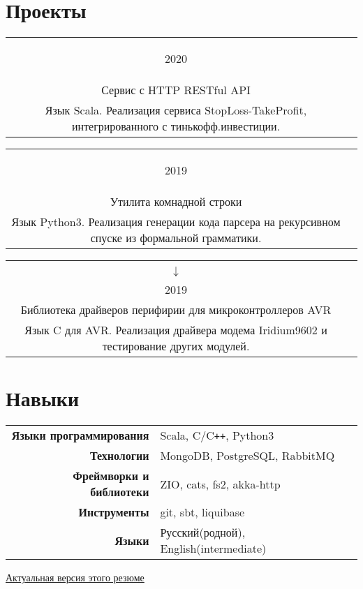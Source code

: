 \documentclass{article}
\newcommand{\entry}[3]{
	\begin{tabular}{ c | c }
    \begin{minipage}{0.05\linewidth}
    	\begin{center}
    		#1
    	\end{center}
    \end{minipage} 
    &
    \begin{minipage}{0.85\linewidth}
        \textbf{#2} \\ \footnotesize{#3}
    \end{minipage}
    \end{tabular}
}
\newcommand{\interval}[2]{
	#1 \\ $\downarrow$ \\ #2
}
\begin{document}
    \section{Проекты}
        
    \entry {2020}
    {\href {https://gitlab.com/Inversion/gainy}{gainy} - StopLoss-TakeProfit для тинькофф.инвестиции \\
    Сервис с HTTP RESTful API}
    { Язык Scala. Реализация сервиса StopLoss-TakeProfit, интегрированного с тинькофф.инвестиции. } 
    
    \vspace{.1cm}
        
    \entry {2019}
    {\href {https://github.com/InversionSpaces/PEGgen}{PEGgen} - генератор парсеров \\
    Утилита комнадной строки}
    { Язык Python3. Реализация генерации кода парсера на рекурсивном спуске из формальной грамматики.} 
    
    
    \vspace{.1cm}
    
    \entry {\interval{2017}{2019}}
    {\href {https://github.com/cansat-rsce/librscs} {librscs} - библиотека для разработчиков CanSat \\
    Библиотека драйверов перифирии для микроконтроллеров AVR}
    { Язык C для AVR. Реализация драйвера модема Iridium9602 и тестирование других модулей. } 

    \section{Навыки}
    	\begin{tabular}{ >{\bfseries}r | l }
    		Языки программирования & Scala, C/C\texttt{++}, Python3 \\
    		Технологии & MongoDB, PostgreSQL, RabbitMQ  \\
    		Фреймворки и библиотеки & ZIO, cats, fs2, akka-http \\
    		Инструменты & git, sbt, liquibase \\
    		Языки & Русский(родной), English(intermediate)
    	\end{tabular} 
        
    \vspace{\fill}
    \begin{center}
        \large
        \href {https://github.com/InversionSpaces/resume}{Актуальная версия этого резюме}
    \end{center}
\end{document}
